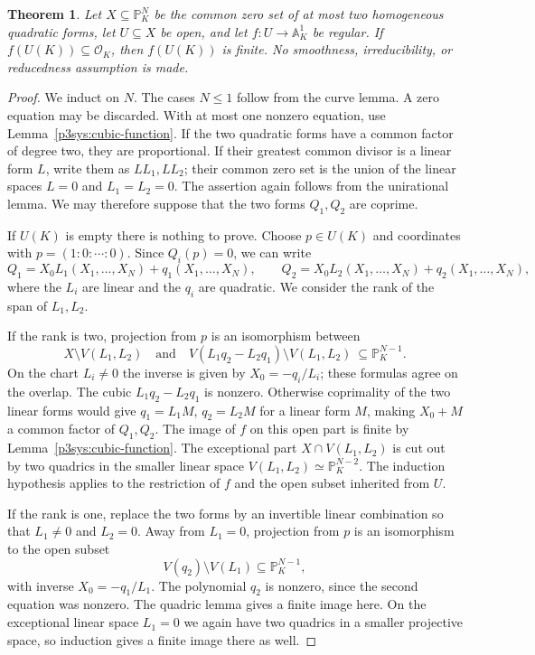 \documentclass[11pt]{article}
\newtheorem{theorem}{Theorem}[section]
\theoremstyle{definition}
\begin{document}
\begin{theorem}\label{p3sys:two-quadrics-any-dimension}
Let $X\subseteq\mathbb P^N_K$ be the common zero set of at most
two homogeneous quadratic forms, let $U\subseteq X$ be open,
and let $f:U\to\mathbb A^1_K$ be regular.  If
$f(U(K))\subseteq\mathcal O_K$, then $f(U(K))$ is finite.
No smoothness, irreducibility, or reducedness assumption is made.
\end{theorem}
\begin{proof}
We induct on $N$.  The cases $N\le1$ follow from the curve lemma.
A zero equation may be discarded.  With at most one nonzero equation,
use Lemma~\ref{p3sys:cubic-function}.  If the two quadratic forms
have a common factor of degree two, they are proportional.  If their
greatest common divisor is a linear form $L$, write them as
$LL_1,LL_2$; their common zero set is the union of the linear
spaces $L=0$ and $L_1=L_2=0$.  The assertion again follows from
the unirational lemma.  We may therefore suppose that the two
forms $Q_1,Q_2$ are coprime.

If $U(K)$ is empty there is nothing to prove.  Choose $p\in U(K)$
and coordinates with $p=(1:0:\cdots:0)$.  Since $Q_i(p)=0$,
we can write
\[
 Q_1=X_0L_1(X_1,\ldots,X_N)+q_1(X_1,\ldots,X_N),\qquad
 Q_2=X_0L_2(X_1,\ldots,X_N)+q_2(X_1,\ldots,X_N),
\]
where the $L_i$ are linear and the $q_i$ are quadratic.  We consider
the rank of the span of $L_1,L_2$.

If the rank is two, projection from $p$ is an isomorphism between
\[
 X\setminus V(L_1,L_2)
 \quad\text{and}\quad
 V(L_1q_2-L_2q_1)\setminus V(L_1,L_2)
          \ \subseteq\mathbb P^{N-1}_K.
\]
On the chart $L_i\ne0$ the inverse is given by
$X_0=-q_i/L_i$; these formulas agree on the overlap.  The cubic
$L_1q_2-L_2q_1$ is nonzero.  Otherwise coprimality of the two
linear forms would give $q_1=L_1M$, $q_2=L_2M$ for a linear
form $M$, making $X_0+M$ a common factor of $Q_1,Q_2$.
The image of $f$ on this open part is finite by
Lemma~\ref{p3sys:cubic-function}.  The exceptional part
$X\cap V(L_1,L_2)$ is cut out by two quadrics in the smaller
linear space $V(L_1,L_2)\simeq\mathbb P^{N-2}_K$.
The induction hypothesis applies to the restriction of $f$ and
the open subset inherited from $U$.

If the rank is one, replace the two forms by an invertible linear
combination so that $L_1\ne0$ and $L_2=0$.  Away from $L_1=0$,
projection from $p$ is an isomorphism to the open subset
\[
                         V(q_2)\setminus V(L_1)
                          \subseteq\mathbb P^{N-1}_K,
\]
with inverse $X_0=-q_1/L_1$.  The polynomial $q_2$ is nonzero,
since the second equation was nonzero.  The quadric lemma gives
a finite image here.  On the exceptional linear space $L_1=0$
we again have two quadrics in a smaller projective space, so
induction gives a finite image there as well.


\end{proof}
\end{document}
